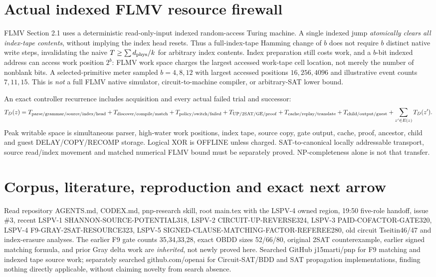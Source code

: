 \documentclass[11pt]{article}
\begin{document}
\section{Actual indexed FLMV resource firewall}
FLMV Section 2.1 uses a deterministic read-only-input indexed random-access Turing machine. A single indexed jump \emph{atomically clears all index-tape contents}, without implying the index head resets. Thus a full-index-tape Hamming change of $b$ does not require $b$ distinct native write steps, invalidating the naive $T\ge\sum d_{\rm phys}/k$ for arbitrary index contents. Index preparation still costs work, and a $b$-bit indexed address can access work position $2^b$: FLMV work space charges the largest accessed work-tape cell location, not merely the number of nonblank bits. A selected-primitive meter sampled $b=4,8,12$ with largest accessed positions $16,256,4096$ and illustrative event counts $7,11,15$. This is \emph{not} a full FLMV native simulator, circuit-to-machine compiler, or arbitrary-SAT lower bound.

An exact controller recurrence includes acquisition and every actual failed trial and successor:
\[
T_D(z)=T_{\rm parse/grammar/source/index/head}+T_{\rm discover/compile/match}
+T_{\rm policy/switch/failed}+T_{\rm UP/2SAT/GE/proof}
+T_{\rm cache/replay/translate}+T_{\rm child/output/guest}
+\sum_{z'\in E(z)}T_D(z').
\]
Peak writable space is simultaneous parser, high-water work positions, index tape, source copy, gate output, cache, proof, ancestor, child and guest DELAY/COPY/RECOMP storage. Logical XOR is OFFLINE unless charged. SAT-to-canonical locally addressable transport, source read/index movement and matched numerical FLMV bound must be separately proved. NP-completeness alone is not that transfer.

\section{Corpus, literature, reproduction and exact next arrow}
Read repository AGENTS.md, CODEX.md, pnp-research skill, root main.tex with the LSPV-4 owned region, 19:50 five-role handoff, issue \#3, recent LSPV-1 SHANNON-SOURCE-POTENTIAL318, LSPV-2 CIRCUIT-UP-REVERSE324, LSPV-3 PAID-COFACTOR-GATE320, LSPV-4 F9-GRAY-2SAT-RESOURCE323, LSPV-5 SIGNED-CLAUSE-MATCHING-FACTOR-REFEREE280, old circuit Tseitin46/47 and index-erasure analyses. The earlier F9 gate counts 35,34,33,28, exact OBDD sizes 52/66/80, original 2SAT counterexample, earlier signed matching formula, and prior Gray delta work are \emph{inherited}, not newly proved here. Searched GitHub j15marti/pnp for F9 matching and indexed tape source work; separately searched github.com/openai for Circuit-SAT/BDD and SAT propagation implementations, finding nothing directly applicable, without claiming novelty from search absence.
\end{document}
